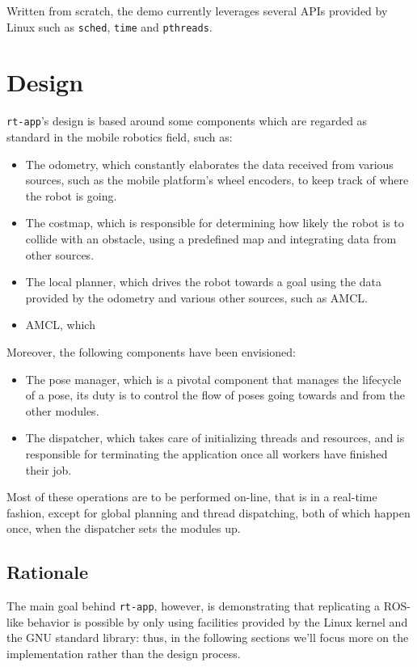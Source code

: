 \documentclass[a4paper,12pt]{report}
\begin{document}
Written from scratch, the demo currently leverages several APIs provided by Linux such as \texttt{sched}, \texttt{time} and \texttt{pthreads}.

\section{Design}


\texttt{rt-app}'s design is based around some components which are regarded as standard in the mobile robotics field, such as:
\begin{itemize}
    \item The odometry, which constantly elaborates the data received from various sources, such as the mobile platform's wheel encoders, to keep track of where the robot is going.
    \item The costmap, which is responsible for determining how likely the robot is to collide with an obstacle, using a predefined map and integrating data from other sources.
    \item The local planner, which drives the robot towards a goal using the data provided by the odometry and various other sources, such as AMCL.
    \item AMCL, which
\end{itemize}

Moreover, the following components have been envisioned:
\begin{itemize}
  \item The pose manager, which is a pivotal component that manages the lifecycle of a pose, its duty is to control the flow of poses going towards and from the other modules.
  \item The dispatcher, which takes care of initializing threads and resources, and is responsible for terminating the application once all workers have finished their job.
\end{itemize}

Most of these operations are to be performed on-line, that is in a real-time fashion, except for global planning and thread dispatching, both of which happen once, when the dispatcher sets the modules up.

\subsection{Rationale}

The main goal behind \texttt{rt-app}, however, is demonstrating that replicating a ROS-like behavior is possible by only using facilities provided by the Linux kernel and the GNU standard library: thus, in the following sections we'll focus more on the implementation rather than the design process.
\end{document}
